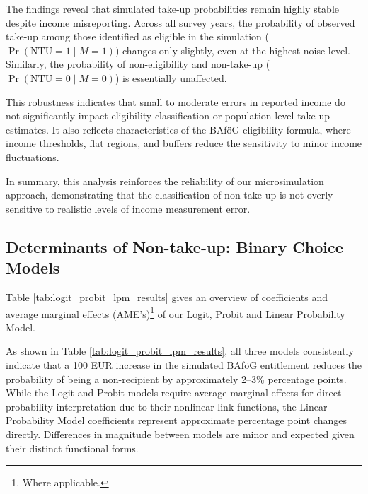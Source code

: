 

The findings reveal that simulated take-up probabilities remain highly stable despite income misreporting. 
Across all survey years, the probability of observed take-up among those identified as eligible in the simulation (\( \Pr(\mathrm{NTU}=1 \mid M=1) \)) changes only slightly, even at the highest noise level. 
Similarly, the probability of non-eligibility and non-take-up (\( \Pr(\mathrm{NTU}=0 \mid M=0) \)) is essentially unaffected.

This robustness indicates that small to moderate errors in reported income do not significantly impact eligibility classification or population-level take-up estimates. 
It also reflects characteristics of the BAföG eligibility formula, where income thresholds, flat regions, and buffers reduce the sensitivity to minor income fluctuations.

In summary, this analysis reinforces the reliability of our microsimulation approach, demonstrating that the classification of non-take-up is not overly sensitive to realistic levels of income measurement error.



\subsection{Determinants of Non-take-up: Binary Choice Models}
Table \ref{tab:logit_probit_lpm_results} gives an overview of coefficients and average marginal effects (AME's)\footnote{Where applicable.} of our Logit, Probit and Linear Probability Model. 

As shown in Table \ref{tab:logit_probit_lpm_results}, all three models consistently indicate that a 100 EUR increase in the simulated BAföG entitlement reduces the probability of being a non-recipient by approximately 2--3\% percentage points. 
While the Logit and Probit models require average marginal effects for direct probability interpretation due to their nonlinear link functions, the Linear Probability Model coefficients represent approximate percentage point changes directly. 
Differences in magnitude between models are minor and expected given their distinct functional forms.



